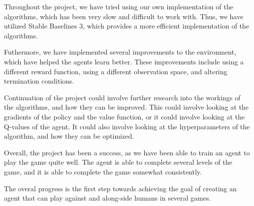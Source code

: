 Throughout the project, we have tried using our own implementation of the
algorithms, which has been very slow and difficult to work with. Thus, we have
utilized Stable Baselines 3, which provides a more efficient implementation
of the algorithms.

Futhermore, we have implemented several improvements to the environment, which
have helped the agents learn better. These improvements include using a
different reward function, using a different observation space, and altering
termination conditions.

Continuation of the project could involve further research into the workings
of the algorithms, and how they can be improved. This could involve looking at
the gradients of the policy and the value function, or it could involve
looking at the Q-values of the agent. It could also involve looking at the
hyperparameters of the algorithm, and how they can be optimized.

Overall, the project has been a success, as we have been able to train an agent
to play the game quite well. The agent is able to complete several levels of
the game, and it is able to complete the game somewhat consistently.

The overal progress is the first step towards achieving the goal of creating
an agent that can play against and along-side humans in several games.
